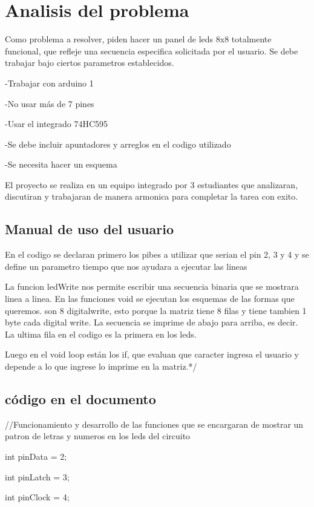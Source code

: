 \documentclass{article}
\begin{document}
\section{Analisis del problema} \label{contenido}
Como problema a resolver, piden hacer un panel de leds 8x8 totalmente funcional, que refleje una secuencia especifica solicitada por el usuario.
Se debe trabajar bajo ciertos parametros establecidos.

-Trabajar con arduino 1

-No usar más de 7 pines

-Usar el integrado 74HC595

-Se debe incluir apuntadores y arreglos en el codigo utilizado

-Se necesita hacer un esquema

El proyecto se realiza en un equipo integrado por 3 estudiantes que analizaran, discutiran y trabajaran de manera armonica para completar la tarea con exito.


\subsection{Manual de uso del usuario}


En el codigo se declaran primero los pibes a utilizar que serian 
el pin 2, 3 y 4 y se define un parametro tiempo que nos ayudara
a ejecutar las lineas

La funcion ledWrite nos permite escribir una secuencia binaria que
se mostrara linea a linea.
En las funciones void se ejecutan los esquemas de las formas que 
queremos.
son 8 digitalwrite, esto porque la matriz tiene 8 filas
y tiene tambien 1 byte cada digital write.
La secuencia se imprime de abajo para arriba, es decir.
La ultima fila en el codigo es la primera en los leds.

Luego en el void loop están los if, que evaluan que caracter ingresa el 
usuario y depende a lo que ingrese lo imprime en la matriz.*/

\subsection{código en el documento}
//Funcionamiento y desarrollo de las funciones que se encargaran de mostrar un patron de letras y numeros en los leds del circuito 


int pinData  = 2;

int pinLatch = 3;

int pinClock = 4;
\end{document}
